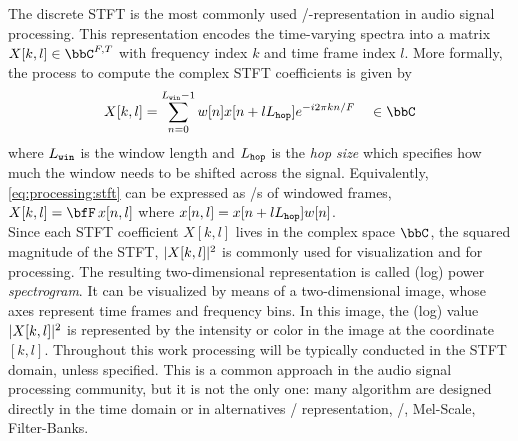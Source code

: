 \mynewline
The discrete \ac{STFT}
is the most commonly used \TF/-representation in audio signal processing.
This representation encodes the time-varying spectra into a matrix $X[k,l] \in \bbC^{F,T}$ with frequency index $k$ and time frame index $l$.
More formally, the process to compute the complex \ac{STFT} coefficients is given by
\begin{equation}\label{eq:processing:stft}
    X[k, l]  = \sum_{n=0}^{\winsize-1} w[n] x[n + l \hopsize] \cste^{- \csti 2 \pi k n / F} \mathspace\in\bbC
\end{equation}
where $L_\mathtt{win}$ is the window length and $L_\mathtt{hop}$ is the \textit{hop size} which specifies how much the window needs to be shifted across the signal.
Equivalently, \cref{eq:processing:stft} can be expressed as \DFT/s of windowed frames, $X[k, l] = \discreteFT{x[n,l]}$ where $x[n,l] = x[n + l L_\mathtt{hop}] w[n]$.
\\Since each \ac{STFT} coefficient $X[k, l]$ lives in the complex space $\bbC$, the squared magnitude of the \ac{STFT}, $|{X[k,l]}|^2$ is
commonly used for visualization and for processing. The resulting two-dimensional representation is called (log) power \textit{spectrogram}. It can be visualized by means of a two-dimensional image, whose axes represent time frames and frequency bins.
In this image, the (log) value $|{X[k,l]}|^2$ is represented by the intensity or color in the image at the coordinate $[k,l]$.
Throughout this work processing will be typically conducted in the \ac{STFT} domain, unless specified.
This is a common approach in the audio signal processing community, but it is not the only one:
many algorithm are designed directly in the time domain or in alternatives \TF/ representation, \eg/, Mel-Scale, Filter-Banks.


